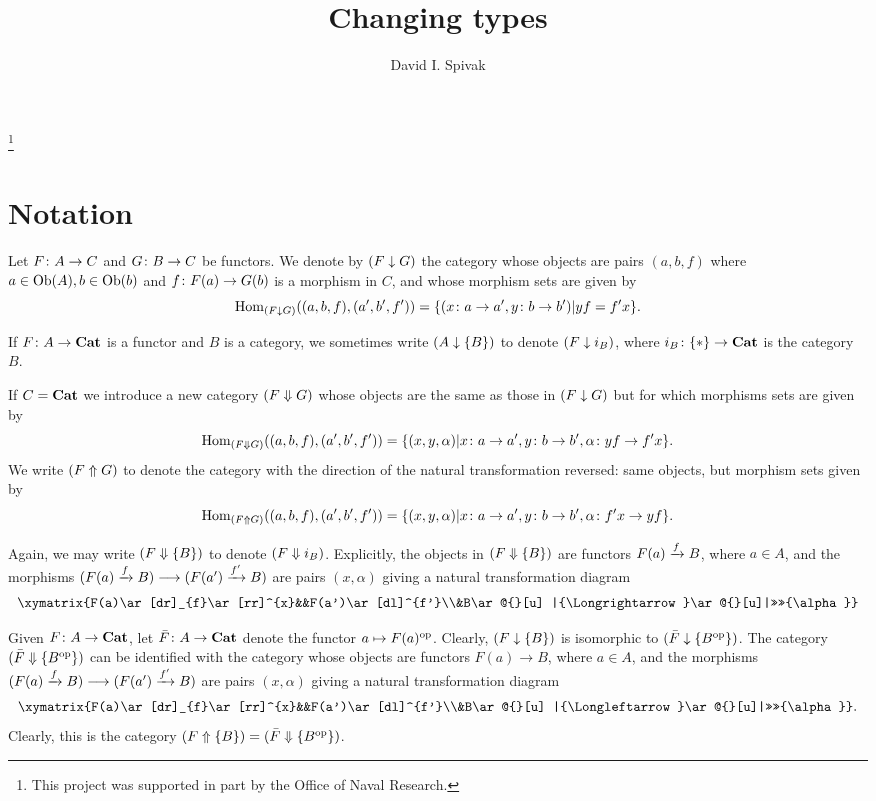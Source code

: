 \documentclass{amsart}
\makeatletter
\newcommand{\TriRight}[7]{\xymatrix{#1\ar[dr]_{#2}\ar[rr]^{#3}&&#4\ar[dl]^{#5}\\&#6\ar@{}[u] |{\Longrightarrow}\ar@{}[u]|>>>>{#7}}}
\newcommand{\TriLeft}[7]{\xymatrix{#1\ar[dr]_{#2}\ar[rr]^{#3}&&#4\ar[dl]^{#5}\\&#6\ar@{}[u] |{\Longleftarrow}\ar@{}[u]|>>>>{#7}}}
\makeatother
\begin{document}
\author{David I. Spivak}

\thanks{This project was supported in part by the Office of Naval Research.}

\title{Changing types}

\maketitle

\section{Notation}

Let $F\colon A\rightarrow C$ and $G\colon B\rightarrow C$ be functors.  We denote by $(F\downarrow G)$ the category whose objects are pairs $(a,b,f)$ where $a\in\textnormal{Ob}(A), b\in\textnormal{Ob}(b)$ and $f\colon F(a)\rightarrow G(b)$ is a morphism in $C$, and whose morphism sets are given by $$\textnormal{Hom}_{(F\downarrow G)}((a,b,f),(a',b',f'))=\{(x\colon a\rightarrow a', y\colon b\rightarrow b')| yf=f'x\}.$$

If $F\colon A\rightarrow{\bf Cat}$ is a functor and $B$ is a category, we sometimes write $(A\downarrow\{B\})$ to denote $(F\downarrow i_B)$, where $i_B\colon\{*\}\rightarrow{\bf Cat}$ is the category $B$.

If $C={\bf Cat}$ we introduce a new category $(F\Downarrow G)$ whose objects are the same as those in $(F\downarrow G)$ but for which morphisms sets are given by $$\textnormal{Hom}_{(F\Downarrow G)}((a,b,f),(a',b',f'))=\{(x,y,\alpha)|x\colon a\rightarrow a',y\colon b\rightarrow b',\alpha\colon yf\rightarrow f'x\}.$$  We write $(F\Uparrow G)$ to denote the category with the direction of the natural transformation reversed: same objects, but morphism sets given by $$\textnormal{Hom}_{(F\Uparrow G)}((a,b,f),(a',b',f'))=\{(x,y,\alpha)|x\colon a\rightarrow a',y\colon b\rightarrow b',\alpha\colon f'x\rightarrow yf\}.$$

Again, we may write $(F\Downarrow\{B\})$ to denote $(F\Downarrow i_B)$.  Explicitly, the objects in $(F\Downarrow\{B\})$ are functors $F(a)\xrightarrow{f} B$, where $a\in A$, and the morphisms $(F(a)\xrightarrow{f} B)\longrightarrow (F(a')\xrightarrow{f'} B)$ are pairs $(x,\alpha)$ giving a natural transformation diagram $$\TriRight{F(a)}{f}{x}{F(a')}{f'}{B}{\alpha}$$

Given $F\colon A\rightarrow{\bf Cat}$, let $\bar{F}\colon A\rightarrow{\bf Cat}$ denote the functor $a\mapsto F(a)^\textnormal{op}$.  Clearly, $(F\downarrow\{B\})$ is isomorphic to $(\bar{F}\downarrow\{B^\textnormal{op}\})$.  The category $(\bar{F}\Downarrow\{B^\textnormal{op}\})$ can be identified with the category whose objects are functors $F(a)\to B$, where $a\in A$, and the morphisms $(F(a)\xrightarrow{f}B)\longrightarrow(F(a')\xrightarrow{f'}B)$ are pairs $(x,\alpha)$ giving a natural transformation diagram $$\TriLeft{F(a)}{f}{x}{F(a')}{f'}{B}{\alpha}.$$  Clearly, this is the category $(F\Uparrow\{B\})=(\bar{F}\Downarrow\{B^\textnormal{op}\})$.
\end{document}

